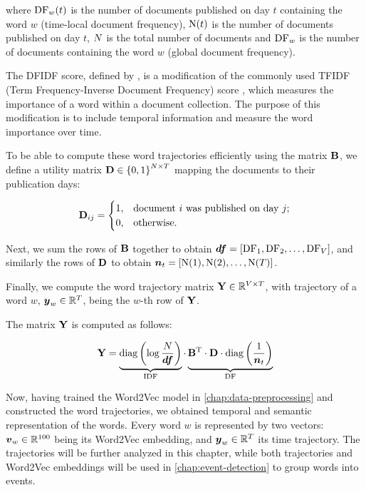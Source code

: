 where $\text{DF}_{w}(t)$ is the number of documents published on day $t$ containing the word $w$ (time-local document frequency), $\text{N}(t)$ is the number of documents published on day $t$, $N$ is the total number of documents and $\text{DF}_{w}$ is the number of documents containing the word $w$ (global document frequency).

The DFIDF score, defined by \cite{event-detection}, is a modification of the commonly used TFIDF (Term Frequency-Inverse Document Frequency) score \citep{tfidf, information-retrieval}, which measures the importance of a word within a document collection. The purpose of this modification is to include temporal information and measure the word importance over time.

To be able to compute these word trajectories efficiently using the matrix $\mathbf{B}$, we define a utility matrix $\mathbf{D} \in \left\{ 0, 1 \right\}^{N \times T}$ mapping the documents to their publication days:

\begin{equation}
	\mathbf{D}_{ij} =
	\begin{cases}
		1, & \text{document}~i~\text{was published on day}~j \text{;} \\
		0, & \text{otherwise}.
	\end{cases}
\end{equation}

Next, we sum the rows of $\mathbf{B}$ together to obtain $\vect{\df} = \left[ \text{\df}_{1}, \text{\df}_{2}, \dots, \text{\df}_{\featcount} \right]$, and similarly the rows of $\mathbf{D}$ to obtain $\vect{\doccount}_{t} = \left[ \text{\doccount}(1), \text{\doccount}(2), \dots, \text{\doccount}(\streamlen) \right]$.

Finally, we compute the word trajectory matrix $\mathbf{Y} \in \mathbb{R}^{V \times T}$, with trajectory of a word $w$, $\vect{\traj}_w \in \R^{\streamlen}$, being the $w$-th row of $\mathbf{Y}$.

The matrix $\mathbf{Y}$ is computed as follows:

\begin{equation}
	\trajmat =
		\underbrace{\text{diag} \left( \log{\frac{\doccount}{\vect{\df}}} \right)}_{\text{IDF}}
		\cdot
		\underbrace{\bowmat^{\T}
		\cdot \dtdmat
		\cdot \text{diag} \left( \frac{1}{\vect{\doccount}_{t}} \right)}_{\text{DF}}
\end{equation}

Now, having trained the Word2Vec model in \autoref{chap:data-preprocessing} and constructed the word trajectories, we obtained temporal and semantic representation of the words. Every word $w$ is represented by two vectors: $\embed_{w} \in \R^{100}$ being its Word2Vec embedding, and $\vect{\traj}_{w} \in \R^{\streamlen}$ its time trajectory. The trajectories will be further analyzed in this chapter, while both trajectories and Word2Vec embeddings will be used in \autoref{chap:event-detection} to group words into events.


